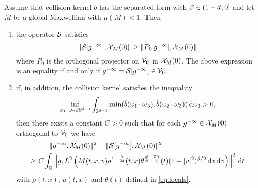 \begin{theorem}
	\label{th:sc:2}
	Assume that collision kernel $b$ has the separated form with $\beta\in ( 1-d ,0]$ and let $M$ be a global Maxwellian with $\mu(M)<1$. Then
	\begin{enumerate}
		\item the operator $\mathcal S$ satisfies \[\|\mathcal S[{g^{-\infty}}],{\mathcal X_M(0)}\|\ge \|P_0[{g^{-\infty}}],{\mathcal X_M(0)}\|\]
		where $P_0$ is the orthogonal projector on ${\mathcal V_0}$ in ${\mathcal X_M(0)}$. The  above expression is an equality  if and only if ${g^{-\infty}}=\mathcal S[{g^{-\infty}}]\in {\mathcal V_0}$.
		\item if, in addition, the collision kernel satisfies the inequality
		\[\inf_{\omega_1,\, \omega_2\in{\mathbb S^{d-1}}}\int_{{\mathbb S^{d-1}}} \min(\hat b(\omega_1\cdot \omega_3),\hat  b(\omega_2\cdot \omega_3)){\,\mathrm{d} \omega}_3>0,\]
		then there exists a constant $C>0$ such that for each $ {g^{-\infty}}\in{\mathcal X_M(0)}$ orthogonal to  $ {\mathcal V_0}$ we have 
		\begin{equation}\label{eq:key}
			\begin{aligned}
					 \|& {g^{-\infty}} ,{\mathcal X_M(0)}\|^2-\|\mathcal S[{g^{-\infty}}],{\mathcal X_M(0)}\|^2 
					 \\ \ge C \int_{{\mathbb R}}&\left\|g,L^2\left(M(t,x,v)\rho^{1-\frac{\beta}{2d}}(t,x)\theta^{\frac{d}{2}-\frac{3 \beta}{4}}	(t)(1+|v|^2)^{\beta/2}{\,\mathrm{d} x}{\,\mathrm{d} v} \right)\right\|^2{\,\mathrm dt}
				\end{aligned}
		\end{equation}	
		with $\rho(t,x)$, $u(t,x)$ and $\theta(t)$ defined in \eqref{eq:locals}.
 	\end{enumerate}
\end{theorem}
